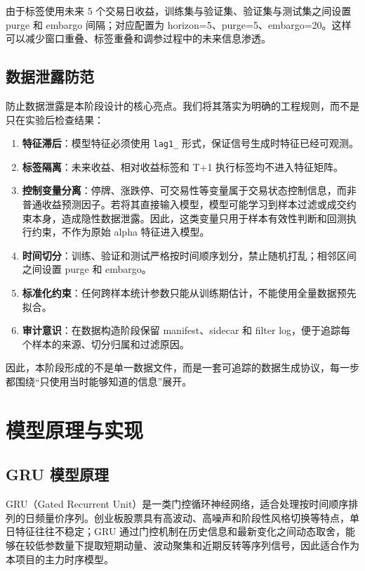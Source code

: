 \documentclass[12pt,a4paper,cn,bibtex]{elegantpaper}
\begin{document}
由于标签使用未来 5 个交易日收益，训练集与验证集、验证集与测试集之间设置 purge 和 embargo 间隔；对应配置为 horizon=5、purge=5、embargo=20。这样可以减少窗口重叠、标签重叠和调参过程中的未来信息渗透。

\subsection{数据泄露防范}

防止数据泄露是本阶段设计的核心亮点。我们将其落实为明确的工程规则，而不是只在实验后检查结果：

\begin{enumerate}
    \item \textbf{特征滞后}：模型特征必须使用 \texttt{lag1\_} 形式，保证信号生成时特征已经可观测。
    \item \textbf{标签隔离}：未来收益、相对收益标签和 T+1 执行标签均不进入特征矩阵。
    \item \textbf{控制变量分离}：停牌、涨跌停、可交易性等变量属于交易状态控制信息，而非普通收益预测因子。若将其直接输入模型，模型可能学习到样本过滤或成交约束本身，造成隐性数据泄露。因此，这类变量只用于样本有效性判断和回测执行约束，不作为原始 alpha 特征进入模型。
    \item \textbf{时间切分}：训练、验证和测试严格按时间顺序划分，禁止随机打乱；相邻区间之间设置 purge 和 embargo。
    \item \textbf{标准化约束}：任何跨样本统计参数只能从训练期估计，不能使用全量数据预先拟合。
    \item \textbf{审计意识}：在数据构造阶段保留 manifest、sidecar 和 filter log，便于追踪每个样本的来源、切分归属和过滤原因。
\end{enumerate}

因此，本阶段形成的不是单一数据文件，而是一套可追踪的数据生成协议，每一步都围绕“只使用当时能够知道的信息”展开。

\section{模型原理与实现}

\subsection{GRU 模型原理}
GRU（Gated Recurrent Unit）是一类门控循环神经网络，适合处理按时间顺序排列的日频量价序列。创业板股票具有高波动、高噪声和阶段性风格切换等特点，单日特征往往不稳定；GRU 通过门控机制在历史信息和最新变化之间动态取舍，能够在较低参数量下提取短期动量、波动聚集和近期反转等序列信号，因此适合作为本项目的主力时序模型。
\end{document}
